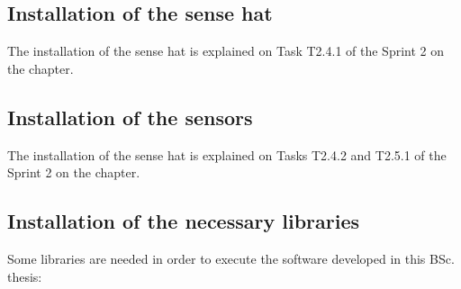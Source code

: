 \subsection{Installation of the sense hat}
The installation of the sense hat is explained on Task T2.4.1 of the Sprint 2 on the   chapter.

\subsection{Installation of the sensors}
The installation of the sense hat is explained on Tasks T2.4.2 and T2.5.1 of the Sprint 2 on the   chapter.


\subsection{Installation of the necessary libraries}
Some libraries are needed in order to execute the software developed in this \ac{BSc.} thesis:
